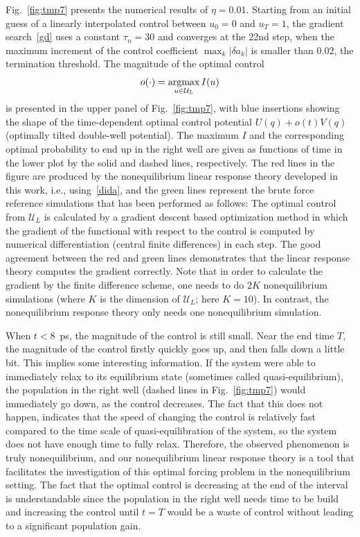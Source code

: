 \documentclass[]{tMPH2e}
\newcommand{\recheck}[1]{{\color{red} #1}}
\newcommand{\redc}[1]{{\color{red} #1}}
\begin{document}
Fig.~\ref{fig:tmp7} presents the numerical results of $\eta = 0.01$.
Starting from an initial guess of a linearly interpolated control between $u_0 = 0$ and
$u_T = 1$, the gradient search~\eqref{gd} \recheck{uses a constant $\tau_n = 30$ and} converges at the 22nd step, when the
maximum increment of the control coefficient $\max_k\vert \delta a_k\vert$
is smaller than $0.02$, the termination threshold.
The magnitude of the optimal control 
\[
o(\cdot) = \mathop{\rm argmax}_{u \in{\mathcal U}_{L}} I(u)
\] 
is presented in the upper panel of Fig.~\ref{fig:tmp7},
with blue insertions showing the shape of the time-dependent optimal control potential 
$U(q) + o(t) V(q)$ (optimally tilted double-well potential). 
The maximum $I$ and the corresponding optimal probability to end up in the right well are
given as functions of time in the lower plot by the solid and dashed lines, respectively.
The red lines in the figure are produced by the nonequilibrium
linear response theory developed in this work, i.e., using~\eqref{dida},
and the green lines represent the brute force reference simulations that has been performed as follows: The optimal control from ${\mathcal U}_{L}$ is calculated by a gradient descent based optimization method in which the gradient of the functional with respect to the control is computed by numerical differentiation (central finite differences) in each step.
The good agreement between the red and green lines demonstrates that 
the linear response theory computes the gradient correctly.
Note that in order to calculate the gradient by the finite difference scheme, one
needs to do $2K$ nonequilibrium simulations
(where $K$ is the dimension of ${\mathcal U}_{L}$; here $K = 10$). In contrast, the nonequilibrium response theory only needs one nonequilibrium simulation.


When $t<8$~\textsf{ps}, the magnitude of the control is still small.  Near the end time $T$, the magnitude of the control firstly
quickly goes up, and then falls down a little bit.  This implies some
interesting information.  If the system were able to immediately relax
to its equilibrium state (sometimes called
quasi-equilibrium), the population in the right well (dashed lines in
Fig.~\ref{fig:tmp7}) would immediately go down, as the control
decreases.  The fact that this does not happen, indicates that the
speed of changing the control is relatively fast compared to the 
time scale of quasi-equilibration of the system, so the system does not have enough time to
fully relax. Therefore, the observed phenomenon is truly
nonequilibrium, and our nonequilibrium linear response theory is a
tool that facilitates the investigation of this optimal forcing
problem in the nonequilibrium setting. The fact that the optimal control is decreasing at the end of the interval is understandable since the population in the right well needs time to be build and increasing the control until $t=T$ would be a waste of control without leading to a significant population gain.
\end{document}
